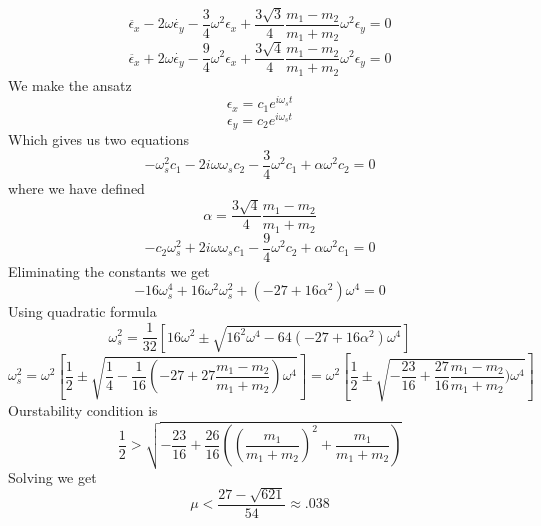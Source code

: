 \begin{equation}
\ddot{\epsilon_x} - 2\omega \dot{\epsilon_y} - \frac{3}{4} \omega^2 \epsilon_x + \frac{3\sqrt{3}}{4} \frac{m_1 - m_2}{m_1 + m_2} \omega^2 \epsilon_y = 0
\end{equation}
\begin{equation}
\ddot{\epsilon_x} +2\omega \dot{\epsilon_y} - \frac{9}{4} \omega^2 \epsilon_x + \frac{3\sqrt{4}}{4}\frac{m_1 - m_2}{m_1 + m_2}\omega^2 \epsilon_y = 0
\end{equation}
We make the ansatz
\begin{equation}
\epsilon_x = c_1 e^{i\omega_s t}
\end{equation}
\begin{equation}
\epsilon_y = c_2 e^{i\omega_s t}
\end{equation}
Which gives us two equations
\begin{equation}
-\omega_s^2 c_1 - 2i\omega \omega_s c_2 - \frac{3}{4} \omega^2 c_1 + \alpha \omega^2 c_2 = 0
\end{equation}
where we have defined
\begin{equation}
\alpha = \frac{3\sqrt{4}}{4}\frac{m_1 - m_2}{m_1 + m_2}
\end{equation}
\begin{equation}
-c_2 \omega_s^2 + 2i\omega \omega_sc_1 - \frac{9}{4} \omega^2 c_2 + \alpha \omega^2 c_1 = 0
\end{equation}
Eliminating the constants we get
\begin{equation}
- 16\omega_s^4 + 16 \omega^2\omega_s^2 + (-27+16\alpha^2)\omega^4  = 0
\end{equation}
Using quadratic formula
\begin{equation}
\omega_s^2 = \frac{1}{32}\left[ 16\omega^2 \pm \sqrt{16^2 \omega^4 - 64 (-27 + 16 \alpha^2) \omega^4}\right] 
\end{equation}
\begin{equation}
\omega_s^2 = \omega^2\left[ \frac{1}{2} \pm \sqrt{\frac{1}{4}  - \frac{1}{16} (-27 + 27 \frac{m_1 - m_2}{m_1 + m_2}) \omega^4}\right] = \omega^2\left[ \frac{1}{2} \pm \sqrt{-\frac{23}{16} + \frac{27}{16} \frac{m_1 - m_2}{m_1 + m_2}) \omega^4}\right] 
\end{equation}
Ourstability condition is
\begin{equation}
\frac{1}{2} > \sqrt{-\frac{23}{16} + \frac{26}{16}( (\frac{m_1}{m_1 + m_2})^2 + \frac{m_1}{m_1 + m_2})}
\end{equation}
Solving we get
\begin{equation}
\mu < \frac{27 - \sqrt{621}}{54} \approx .038
\end{equation}




